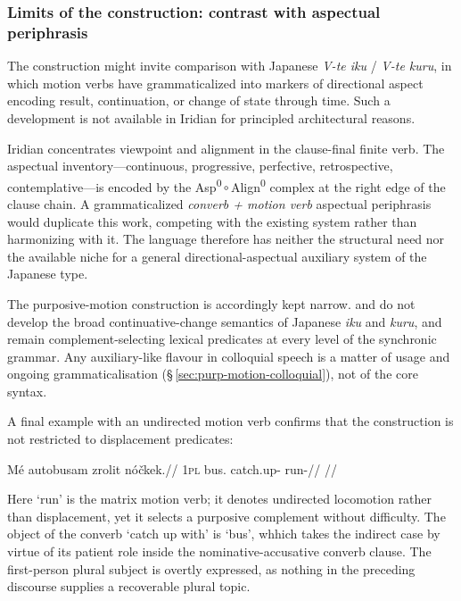 \subsubsection{Limits of the construction: contrast with aspectual
periphrasis}\label{sec:purp-motion-limits}

The construction might invite comparison with Japanese \textit{V-te iku} /
\textit{V-te kuru}, in which motion verbs have grammaticalized into markers of
directional aspect encoding result, continuation, or change of state through
time. Such a development is not available in Iridian for principled
architectural reasons.

Iridian concentrates viewpoint and alignment in the clause-final finite verb.
The aspectual inventory---continuous, progressive, perfective, retrospective,
contemplative---is encoded by the
Asp\textsuperscript{0}\,$\circ$\,Align\textsuperscript{0} complex at the right
edge of the clause chain. A grammaticalized \textit{converb + motion verb}
aspectual periphrasis would duplicate this work, competing with the existing
system rather than harmonizing with it. The language therefore has neither the
structural need nor the available niche for a general directional-aspectual
auxiliary system of the Japanese type.

The purposive-motion construction is accordingly kept narrow.  and
 do not develop the broad continuative-change semantics of Japanese
\textit{iku} and \textit{kuru}, and remain complement-selecting lexical
predicates at every level of the synchronic grammar. Any auxiliary-like flavour
in colloquial speech is a matter of usage and ongoing grammaticalisation
(§\,\ref{sec:purp-motion-colloquial}), not of the core syntax.

A final example with an undirected motion verb confirms that the construction is
not restricted to displacement predicates:

\ex\label{ex:purp-run}%
\begingl
\gla Mé autobusam zrolit nóčkek.//
\glb \textsc{1pl} bus.\Ind{} catch.up-\Purp{} run-\Pf{}//
\glft {}//
\endgl
\xe

Here  `run' is the matrix motion verb; it denotes undirected
locomotion rather than displacement, yet it selects a purposive complement
without difficulty. The object of the converb  `catch up with' is
 `bus', whhich takes the indirect case by virtue of its patient
role inside the nominative-accusative converb clause. The first-person plural
subject  is overtly expressed, as nothing in the preceding discourse
supplies a recoverable plural topic.

